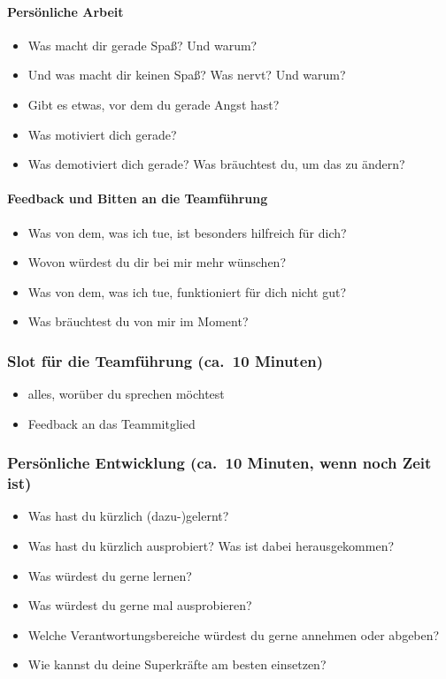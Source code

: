 \paragraph{Persönliche Arbeit}
\begin{itemize}
 \item Was macht dir gerade Spaß? Und warum?
 \item Und was macht dir keinen Spaß? Was nervt? Und warum?
 \item Gibt es etwas, vor dem du gerade Angst hast?
 \item Was motiviert dich gerade?
 \item Was demotiviert dich gerade? Was bräuchtest du, um das zu ändern?
\end{itemize}

\paragraph{Feedback und Bitten an die Teamführung}
\begin{itemize}
 \item Was von dem, was ich tue, ist besonders hilfreich für dich?
 \item Wovon würdest du dir bei mir mehr wünschen?
 \item Was von dem, was ich tue, funktioniert für dich nicht gut?
 \item Was bräuchtest du von mir im Moment?
\end{itemize}


\subsubsection{Slot für die Teamführung (ca.~10 Minuten)}
\begin{itemize}
 \item alles, worüber du sprechen möchtest
 \item Feedback an das Teammitglied
\end{itemize}


\subsubsection{Persönliche Entwicklung (ca.~10 Minuten, wenn noch Zeit ist)}
\begin{itemize}
 \item Was hast du kürzlich (dazu-)gelernt?
 \item Was hast du kürzlich ausprobiert? Was ist dabei herausgekommen?
 \item Was würdest du gerne lernen?
 \item Was würdest du gerne mal ausprobieren?
 \item Welche Verantwortungsbereiche würdest du gerne annehmen oder abgeben?
 \item Wie kannst du deine Superkräfte am besten einsetzen?
\end{itemize}

